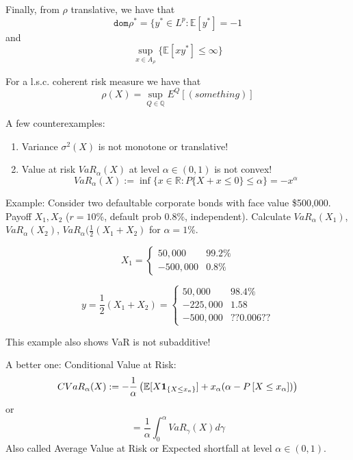 Finally, from $\rho$ translative, we have that
\begin{equation}
	\texttt{dom} \rho^* = \{ y^* \in L^p : \mathbb{E}[y^*] = -1
\end{equation}
and 
\begin{equation}
	\sup_{x\in A_\rho} \{ \mathbb{E}[x y^*] \leq \infty \}
\end{equation}

For a l.s.c. coherent risk measure we have that
\begin{equation}
	\rho(X) = \sup_{Q\in\mathbb{Q}} E^Q \left[ (something) \right]
\end{equation}

A few counterexamples:
\begin{enumerate}
	\item Variance $\sigma^2(X)$ is not monotone or translative!
	\item Value at risk $VaR_\alpha(X)$ at level $\alpha\in (0,1)$ is not convex!
	\begin{equation}
		VaR_\alpha(X) := \inf \{ x \in \mathbb{R} : P \{ X + x \leq 0 \} \leq \alpha \} = -x^\alpha
	\end{equation}
	
\end{enumerate}

Example: Consider two defaultable corporate bonds with face value \$500,000. Payoff $X_1,X_2$ ($r=10$\%, default prob $0.8$\%, independent). Calculate $VaR_\alpha(X_1)$,$VaR_\alpha(X_2)$, $VaR_\alpha(\frac12 (X_1+ X_2)$ for $\alpha=1$\%.

\begin{equation}
	X_1 = \begin{cases}
		50,000 & 99.2\% \\
		-500,000 & 0.8\%
	\end{cases}
\end{equation}

\begin{equation}
	y = \frac12 (X_1 + X_2) = \begin{cases}
		50,000 & 98.4\% \\
		-225,000 & 1.58\\
		-500,000 & ??0.006??
	\end{cases}
\end{equation}

This example also shows VaR is not subadditive!

A better one: Conditional Value at Risk:
\begin{equation}
	CVaR_\alpha(X) := -\frac{1}{\alpha} \left( \mathbb{E}[X{\bf 1}_{\{ X \leq x_a \}}] + x_\alpha(\alpha - P\left[ X \leq x_\alpha \right]) \right)
\end{equation}
or
\begin{equation}
	 = \frac{1}{\alpha} \int_0^\alpha VaR_\gamma (X) d\gamma
\end{equation}
Also called Average Value at Risk or Expected shortfall at level $\alpha\in(0,1)$.

